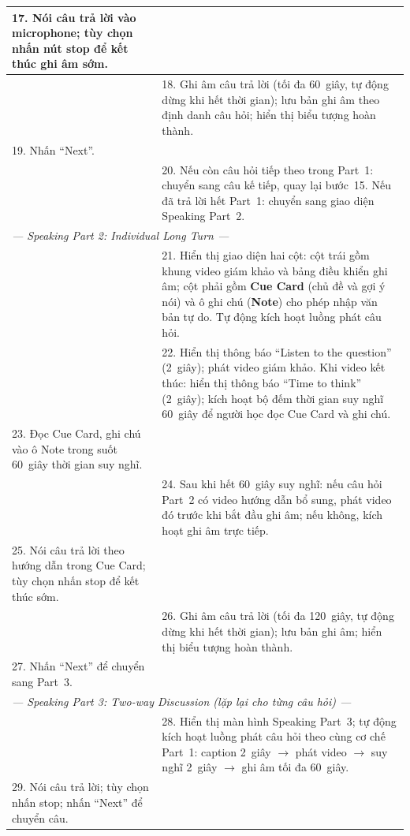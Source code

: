 \begin{longtable}{|p{\tbu}|p{\tbu}|}
    17. Nói câu trả lời vào microphone; tùy chọn nhấn nút stop để kết thúc ghi âm sớm. & \\ \hline
    & 18. Ghi âm câu trả lời (tối đa 60~giây, tự động dừng khi hết thời gian); lưu bản ghi âm theo định danh câu hỏi; hiển thị biểu tượng hoàn thành. \\ \hline
    19. Nhấn ``Next''. & \\ \hline
    & 20. Nếu còn câu hỏi tiếp theo trong Part~1: chuyển sang câu kế tiếp, quay lại bước~15. Nếu đã trả lời hết Part~1: chuyển sang giao diện Speaking Part~2. \\ \hline
    \multicolumn{2}{|l|}{\textit{--- Speaking Part 2: Individual Long Turn ---}} \\ \hline
    & 21. Hiển thị giao diện hai cột: cột trái gồm khung video giám khảo và bảng điều khiển ghi âm; cột phải gồm \textbf{Cue Card} (chủ đề và gợi ý nói) và ô ghi chú (\textbf{Note}) cho phép nhập văn bản tự do. Tự động kích hoạt luồng phát câu hỏi. \\ \hline
    & 22. Hiển thị thông báo ``Listen to the question'' (2~giây); phát video giám khảo. Khi video kết thúc: hiển thị thông báo ``Time to think'' (2~giây); kích hoạt bộ đếm thời gian suy nghĩ 60~giây để người học đọc Cue Card và ghi chú. \\ \hline
    23. Đọc Cue Card, ghi chú vào ô Note trong suốt 60~giây thời gian suy nghĩ. & \\ \hline
    & 24. Sau khi hết 60~giây suy nghĩ: nếu câu hỏi Part~2 có video hướng dẫn bổ sung, phát video đó trước khi bắt đầu ghi âm; nếu không, kích hoạt ghi âm trực tiếp. \\ \hline
    25. Nói câu trả lời theo hướng dẫn trong Cue Card; tùy chọn nhấn stop để kết thúc sớm. & \\ \hline
    & 26. Ghi âm câu trả lời (tối đa 120~giây, tự động dừng khi hết thời gian); lưu bản ghi âm; hiển thị biểu tượng hoàn thành. \\ \hline
    27. Nhấn ``Next'' để chuyển sang Part~3. & \\ \hline
    \multicolumn{2}{|l|}{\textit{--- Speaking Part 3: Two-way Discussion (lặp lại cho từng câu hỏi) ---}} \\ \hline
    & 28. Hiển thị màn hình Speaking Part~3; tự động kích hoạt luồng phát câu hỏi theo cùng cơ chế Part~1: caption 2~giây $\to$ phát video $\to$ suy nghĩ 2~giây $\to$ ghi âm tối đa 60~giây. \\ \hline
    29. Nói câu trả lời; tùy chọn nhấn stop; nhấn ``Next'' để chuyển câu. & \\ \hline

\end{longtable}
